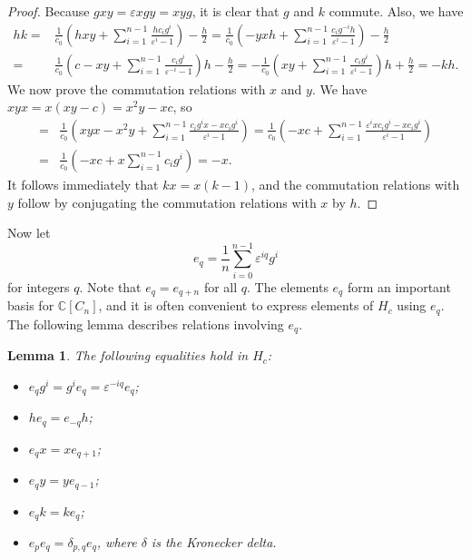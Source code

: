 \documentclass[pdftex]{sigma}
\newcommand\CC{\mathbb{C}}
\newcommand\eps{\varepsilon}
\numberwithin{equation}{section}
\newtheorem{Lemma}[Theorem]{Lemma}
\theoremstyle{definition}
\begin{document}
\begin{proof}
 Because $gxy = \eps xgy = xyg$,
 it is clear that $g$ and $k$ commute.
 Also, we have
 \begin{align*}
 hk ={}& \frac1{c_0} \left( hxy
 + \sum\limits_{i = 1}^{n - 1}
 \frac{h c_i g^i}{\eps^i - 1} \right) - \frac{h}{2}= \frac1{c_0} \left( -yx h
 + \sum\limits_{i = 1}^{n - 1}
 \frac{c_i g^{-i} h}{\eps^i - 1} \right) - \frac{h}{2} \\
 ={}& \frac1{c_0} \left( c - xy
 + \sum\limits_{i = 1}^{n - 1}
 \frac{c_i g^i}{\eps^{-i} - 1} \right) h - \frac{h}{2}= - \frac1{c_0} \left( xy
 + \sum\limits_{i = 1}^{n - 1}
 \frac{c_i g^i}{\eps^i - 1} \right) h + \frac{h}{2}= -kh.
 \end{align*}
 We now prove the commutation relations with $x$ and $y$.
 We have $xyx = x(xy - c) = x^2 y - xc$,
 so
 \begin{align*}
 [k, x]
 ={}& \frac1{c_0} \left( xyx - x^2 y
 + \sum\limits_{i = 1}^{n - 1}
 \frac{c_i g^i x - x c_i g^i}{\eps^i - 1} \right)= \frac1{c_0} \left( -xc
 + \sum\limits_{i = 1}^{n - 1}
 \frac{\eps^i x c_i g^i - x c_i g^i}{\eps^i - 1} \right) \\
 ={}& \frac1{c_0} \left( -xc
 + x \sum\limits_{i = 1}^{n - 1} c_i g^i \right) = -x.
 \end{align*}
 It follows immediately that $kx = x(k - 1)$,
 and the commutation relations with $y$
 follow by conjugating the commutation relations with $x$
 by $h$.
\end{proof}

Now let
\begin{equation*}
 e_q = \frac1n \sum\limits_{i = 0}^{n - 1} \eps^{iq} g^i
\end{equation*}
for integers $q$.
Note that $e_q = e_{q + n}$ for all $q$.
The elements $e_q$ form an important basis for $\CC[C_n]$,
and it is often convenient to express elements of $H_c$
using $e_q$.
The following lemma describes relations
involving $e_q$.

\begin{Lemma}
 \label{lem:e_prop}
 The following equalities hold in $H_c$:
 \begin{itemize}\itemsep=0pt
 \item $e_q g^i = g^i e_q = \eps^{-iq} e_q$;
 \item $h e_q = e_{-q} h$;
 \item $e_q x = x e_{q + 1}$;
 \item $e_q y = y e_{q - 1}$;
 \item $e_q k = k e_q$;
 \item $e_p e_q = \delta_{p, q} e_q$,
 where $\delta$ is the Kronecker delta.
 \end{itemize}
\end{Lemma}
\end{document}
